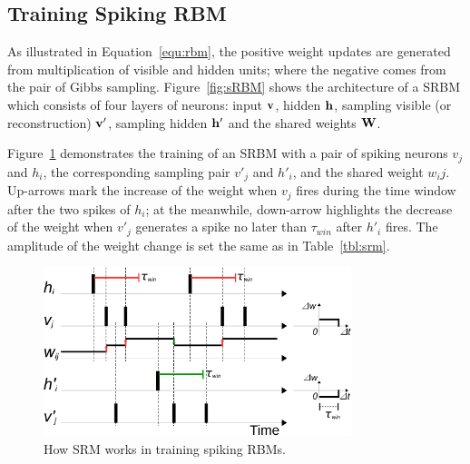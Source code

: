 \subsection{Training Spiking RBM}
As illustrated in Equation~\ref{equ:rbm}, the positive weight updates are generated from multiplication of visible and hidden units; where the negative comes from the pair of Gibbs sampling.
Figure~\ref{fig:sRBM} shows the architecture of a SRBM which consists of four layers of neurons: input $\bf{v}$, hidden $\bf{h}$, sampling visible (or reconstruction) $\bf{v'}$, sampling hidden $\bf{h'}$ and the shared weights $\bf{W}$.

Figure~\ref{fig:rSTDP_rbm} demonstrates the training of an SRBM with a pair of spiking neurons $v_j$ and $h_i$, the corresponding sampling pair $v'_j$ and $h'_i$, and the shared weight $w_ij$.
Up-arrows mark the increase of the weight when $v_j$ fires during the time window after the two spikes of $h_i$;
at the meanwhile, down-arrow highlights the decrease of the weight when $v'_j$ generates a spike no later than $\tau_{win}$ after $h'_i$ fires.
The amplitude of the weight change is set the same as in Table~\ref{tbl:srm}.


\begin{figure}
	\centering
	\includegraphics[width=0.8\textwidth]{pics_sdlm/rSTDP_rbm.pdf}
	\caption{How SRM works in training spiking RBMs.}
	\label{fig:rSTDP_rbm}
\end{figure}




